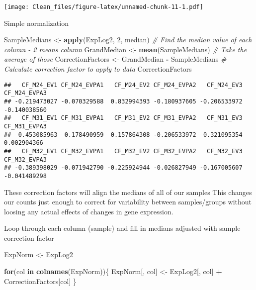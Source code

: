 \documentclass[
]{article}
\newenvironment{Shaded}{\begin{snugshade}}{\end{snugshade}}
\newcommand{\CommentTok}[1]{\textcolor[rgb]{0.56,0.35,0.01}{\textit{#1}}}
\newcommand{\ControlFlowTok}[1]{\textcolor[rgb]{0.13,0.29,0.53}{\textbf{#1}}}
\newcommand{\DecValTok}[1]{\textcolor[rgb]{0.00,0.00,0.81}{#1}}
\newcommand{\FunctionTok}[1]{\textcolor[rgb]{0.13,0.29,0.53}{\textbf{#1}}}
\newcommand{\NormalTok}[1]{#1}
\newcommand{\OtherTok}[1]{\textcolor[rgb]{0.56,0.35,0.01}{#1}}
\newcommand{\SpecialCharTok}[1]{\textcolor[rgb]{0.81,0.36,0.00}{\textbf{#1}}}
\begin{document}
\texttt{[image: Clean\_files/figure-latex/unnamed-chunk-11-1.pdf]}

Simple normalization

\begin{Shaded}
\begin{Highlighting}[]
\NormalTok{SampleMedians }\OtherTok{\textless{}{-}} \FunctionTok{apply}\NormalTok{(ExpLog2, }\DecValTok{2}\NormalTok{, median) }\CommentTok{\# Find the median value of each column {-} 2 means column}
\NormalTok{GrandMedian }\OtherTok{\textless{}{-}} \FunctionTok{mean}\NormalTok{(SampleMedians) }\CommentTok{\# Take the average of those}
\NormalTok{CorrectionFactors }\OtherTok{\textless{}{-}}\NormalTok{ GrandMedian }\SpecialCharTok{{-}}\NormalTok{ SampleMedians }\CommentTok{\# Calculate correction factor to apply to data}
\NormalTok{CorrectionFactors}
\end{Highlighting}
\end{Shaded}

\begin{verbatim}
##   CF_M24_EV1 CF_M24_EVPA1   CF_M24_EV2 CF_M24_EVPA2   CF_M24_EV3 CF_M24_EVPA3 
## -0.219473027 -0.070329588  0.832994393 -0.180937605 -0.206533972 -0.140038560 
##   CF_M31_EV1 CF_M31_EVPA1   CF_M31_EV2 CF_M31_EVPA2   CF_M31_EV3 CF_M31_EVPA3 
##  0.453085963  0.178490959  0.157864308 -0.206533972  0.321095354  0.002904366 
##   CF_M32_EV1 CF_M32_EVPA1   CF_M32_EV2 CF_M32_EVPA2   CF_M32_EV3 CF_M32_EVPA3 
## -0.389398029 -0.071942790 -0.225924944 -0.026827949 -0.167005607 -0.041489298
\end{verbatim}

These correction factors will align the medians of all of our samples
This changes our counts just enough to correct for variability between
samples/groups without loosing any actual effects of changes in gene
expression.

Loop through each column (sample) and fill in medians adjusted with
sample correction factor

\begin{Shaded}
\begin{Highlighting}[]
\NormalTok{ExpNorm }\OtherTok{\textless{}{-}}\NormalTok{ ExpLog2}

\ControlFlowTok{for}\NormalTok{(col }\ControlFlowTok{in} \FunctionTok{colnames}\NormalTok{(ExpNorm))\{}
\NormalTok{  ExpNorm[, col] }\OtherTok{\textless{}{-}}\NormalTok{ ExpLog2[, col] }\SpecialCharTok{+}\NormalTok{ CorrectionFactors[col]}
\NormalTok{\}}
\end{Highlighting}
\end{Shaded}
\end{document}
